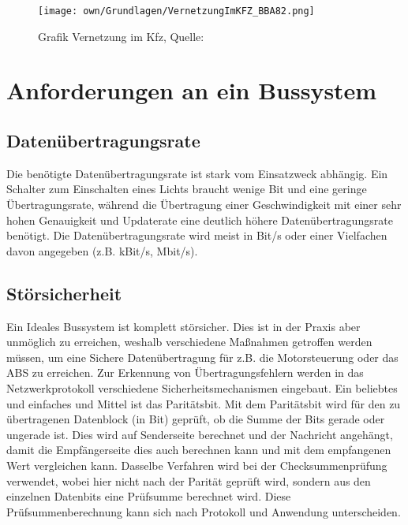 \begin{figure}[!htbp]
    \centering
    \texttt{[image: own/Grundlagen/VernetzungImKFZ\_BBA82.png]}
    \caption{Grafik Vernetzung im \ac{Kfz}, Quelle: \cite{BAA2011, S.85}}
    \label{fig:VernetzungImKFZ}
\end{figure}

\section{Anforderungen an ein Bussystem}
    \subsection{Datenübertragungsrate}
    Die benötigte Datenübertragungsrate ist stark vom Einsatzweck abhängig.
    Ein Schalter zum Einschalten eines Lichts braucht wenige Bit und eine geringe Übertragungsrate, während die Übertragung einer Geschwindigkeit mit einer sehr hohen Genauigkeit und Updaterate eine deutlich höhere Datenübertragungsrate benötigt.
    Die Datenübertragungsrate wird meist in Bit/s oder einer Vielfachen davon angegeben (z.B. kBit/s, Mbit/s). 

    \subsection{Störsicherheit}
    Ein Ideales Bussystem ist komplett störsicher.
    Dies ist in der Praxis aber unmöglich zu erreichen, weshalb verschiedene Maßnahmen getroffen werden müssen, um eine Sichere Datenübertragung für z.B. die Motorsteuerung oder das \ac{ABS} zu erreichen.
    Zur Erkennung von Übertragungsfehlern werden in das Netzwerkprotokoll verschiedene Sicherheitsmechanismen eingebaut.
    Ein beliebtes und einfaches und Mittel ist das Paritätsbit.
    Mit dem Paritätsbit wird für den zu übertragenen Datenblock (in Bit) geprüft, ob die Summe der Bits gerade oder ungerade ist.
    Dies wird auf Senderseite berechnet und der Nachricht angehängt, damit die Empfängerseite dies auch berechnen kann und mit dem empfangenen Wert vergleichen kann.
    Dasselbe Verfahren wird bei der Checksummenprüfung verwendet, wobei hier nicht nach der Parität geprüft wird, sondern aus den einzelnen Datenbits eine Prüfsumme berechnet wird.
    Diese Prüfsummenberechnung kann sich nach Protokoll und Anwendung unterscheiden.

